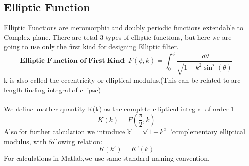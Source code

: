 \documentclass{article}
\begin{document}
\subsection{Elliptic Function}
Elliptic Functions are meromorphic and doubly periodic functions extendable to Complex plane.
There are total 3 types of elliptic functions, but here we are going to use only the first kind for designing Elliptic filter.
\begin{equation}
    \textbf{Elliptic Function of First Kind: }
    F(\phi,k) = \int_{0}^{\phi} \frac{\,d\theta}{\sqrt{1-k^2\sin^2(\theta)}} 
\end{equation}
k is also called the eccentricity or elliptical modulus.(This can be related to arc length finding integral of ellipse)\\
\\
We define another quantity K(k) as the complete elliptical integral of order 1.
\begin{equation}
    K(k) = F(\frac{\pi}{2},k)
\end{equation}
Also for further calculation we introduce k' = $\sqrt{1-k^2}$ 'complementary elliptical modulus, with following relation:
\begin{equation*}
    K(k') = K'(k)
\end{equation*}
For calculations in Matlab,we use same standard naming convention.
\end{document}
